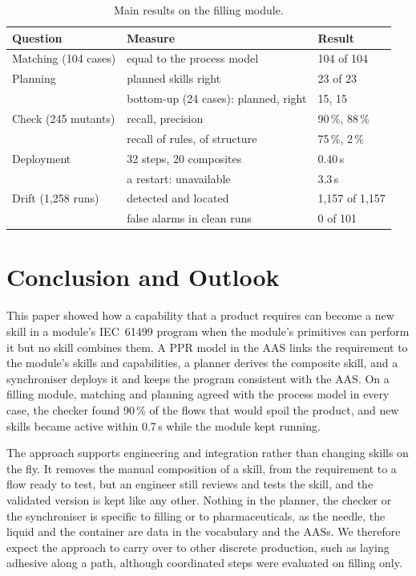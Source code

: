 \documentclass[5p,times,procedia]{elsarticle}
\begin{document}
\begin{table}[t]
\centering
\caption{Main results on the filling module.}
\label{tab:results}
\footnotesize
\setlength{\tabcolsep}{3pt}
\begin{tabular}{@{}lll@{}}
\hline
Question & Measure & Result \\
\hline
Matching (104 cases) & equal to the process model & 104 of 104 \\
Planning & planned skills right & 23 of 23 \\
 & bottom-up (24 cases): planned, right & 15, 15 \\
Check (245 mutants) & recall, precision & 90\,\%, 88\,\% \\
 & recall of rules, of structure & 75\,\%, 2\,\% \\
Deployment & 32 steps, 20 composites & 0.40\,s \\
 & a restart: unavailable & 3.3\,s \\
Drift (1,258 runs) & detected and located & 1,157 of 1,157 \\
 & false alarms in clean runs & 0 of 101 \\
\hline
\end{tabular}
\end{table}

\section{Conclusion and Outlook}
\label{sec:conclusion}

This paper showed how a capability that a product requires can become a new skill in a module's IEC~61499 program when the module's primitives can perform it but no skill combines them. A PPR model in the AAS links the requirement to the module's skills and capabilities, a planner derives the composite skill, and a synchroniser deploys it and keeps the program consistent with the AAS. On a filling module, matching and planning agreed with the process model in every case, the checker found 90\,\% of the flows that would spoil the product, and new skills became active within 0.7\,s while the module kept running.

The approach supports engineering and integration rather than changing skills on the fly. It removes the manual composition of a skill, from the requirement to a flow ready to test, but an engineer still reviews and tests the skill, and the validated version is kept like any other. Nothing in the planner, the checker or the synchroniser is specific to filling or to pharmaceuticals, as the needle, the liquid and the container are data in the vocabulary and the AASs. We therefore expect the approach to carry over to other discrete production, such as laying adhesive along a path, although coordinated steps were evaluated on filling only.
\end{document}
